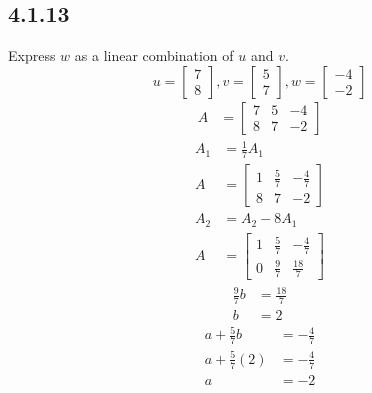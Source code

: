 \documentclass{article}
\begin{document}
\subsection{4.1.13}
Express $ w $ as a linear combination of $ u $ and $ v $.
$$
	u = \begin{bmatrix} 7 \\ 8 \end{bmatrix},
	v = \begin{bmatrix} 5 \\ 7 \end{bmatrix},
	w = \begin{bmatrix} -4 \\ -2 \end{bmatrix}
$$
\begin{align*}
	A & = \begin{bmatrix}
		7 & 5 & -4 \\
		8 & 7 & -2
	\end{bmatrix}
\end{align*}
\begin{align*}
	A_1 & = \frac{1}{7}A_1 \\
	A & = \begin{bmatrix}
		1 & \frac{5}{7} & -\frac{4}{7} \\
		8 & 7 & -2
	\end{bmatrix}
\end{align*}
\begin{align*}
	A_2 & = A_2 - 8A_1 \\
	A & = \begin{bmatrix}
		1 & \frac{5}{7} & -\frac{4}{7} \\
		0 & \frac{9}{7} & \frac{18}{7}
	\end{bmatrix}
\end{align*}
\begin{align*}
	\frac{9}{7}b & = \frac{18}{7} \\
	b & = 2
\end{align*}
\begin{align*}
	a + \frac{5}{7}b & = -\frac{4}{7} \\
	a + \frac{5}{7}(2) & = -\frac{4}{7} \\
	a & = -2
\end{align*}
\end{document}
